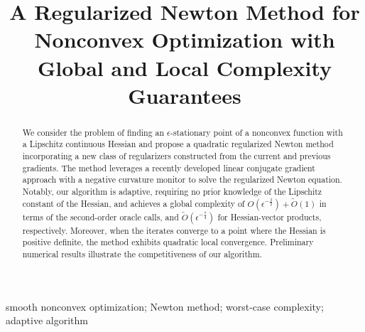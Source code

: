 \documentclass[arxiv,12pt]{colt2025} %
\title[Complexity of Regularized Newton for Nonconvex Optimization]{A Regularized Newton Method for Nonconvex Optimization with Global and Local Complexity Guarantees}
\begin{document}
\maketitle

\begin{abstract}%
  We consider the problem of finding an $\epsilon$-stationary point of a nonconvex function with a Lipschitz continuous Hessian and propose a quadratic regularized Newton method incorporating a new class of regularizers constructed from the current and previous gradients. The method leverages a recently developed linear conjugate gradient approach with a negative curvature monitor to solve the regularized Newton equation. Notably, our algorithm is adaptive, requiring no prior knowledge of the Lipschitz constant of the Hessian, and achieves a global complexity of $O(\epsilon^{-\frac{3}{2}}) + \tilde O(1)$ in terms of the second-order oracle calls, and $\tilde O(\epsilon^{-\frac{7}{4}})$ for Hessian-vector products, respectively. Moreover, when the iterates converge to a point where the Hessian is positive definite, the method exhibits quadratic local convergence. Preliminary numerical results illustrate the competitiveness of our algorithm.
\end{abstract}

\begin{keywords}%
  smooth nonconvex optimization;
  Newton method;
  worst-case complexity;
  adaptive algorithm%
\end{keywords}














\clearpage
\appendix


\tableofcontents

\clearpage









\end{document}
